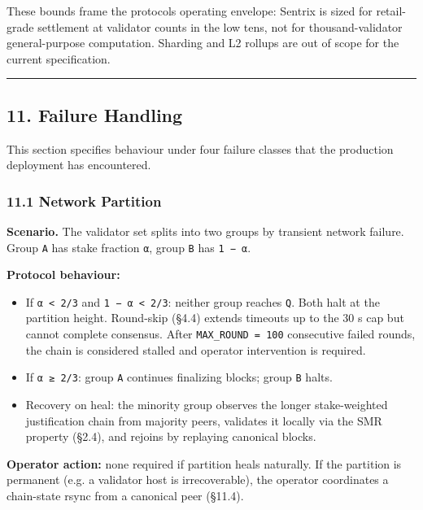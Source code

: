\documentclass[11pt,a4paper]{article}
\providecommand{\tightlist}{\setlength{\itemsep}{0pt}\setlength{\parskip}{0pt}}
\begin{document}
These bounds frame the protocol\textquotesingle s operating envelope:
Sentrix is sized for retail-grade settlement at validator counts in the
low tens, not for thousand-validator general-purpose computation.
Sharding and L2 rollups are out of scope for the current specification.

\begin{center}\rule{0.5\linewidth}{0.5pt}\end{center}

\hypertarget{11-failure-handling}{%
\subsection{11. Failure Handling}\label{11-failure-handling}}

This section specifies behaviour under four failure classes that the
production deployment has encountered.

\hypertarget{111-network-partition}{%
\subsubsection{11.1 Network Partition}\label{111-network-partition}}

\textbf{Scenario.} The validator set splits into two groups by transient
network failure. Group \texttt{A} has stake fraction \texttt{α}, group
\texttt{B} has \texttt{1\ −\ α}.

\textbf{Protocol behaviour:}

\begin{itemize}
\tightlist
\item
  If \texttt{α\ \textless{}\ 2/3} and
  \texttt{1\ −\ α\ \textless{}\ 2/3}: neither group reaches \texttt{Q}.
  Both halt at the partition height. Round-skip (§4.4) extends timeouts
  up to the 30 s cap but cannot complete consensus. After
  \texttt{MAX\_ROUND\ =\ 100} consecutive failed rounds, the chain is
  considered stalled and operator intervention is required.
\item
  If \texttt{α\ ≥\ 2/3}: group \texttt{A} continues finalizing blocks;
  group \texttt{B} halts.
\item
  Recovery on heal: the minority group observes the longer
  stake-weighted justification chain from majority peers, validates it
  locally via the SMR property (§2.4), and rejoins by replaying
  canonical blocks.
\end{itemize}

\textbf{Operator action:} none required if partition heals naturally. If
the partition is permanent (e.g. a validator host is irrecoverable), the
operator coordinates a chain-state rsync from a canonical peer (§11.4).
\end{document}
